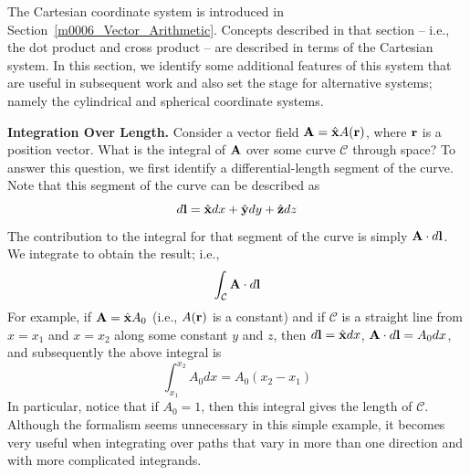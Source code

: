 

\label{m0004_Cartesian_Coordinates} %

The Cartesian coordinate system is introduced in Section~\ref{m0006_Vector_Arithmetic}.
Concepts described in that section -- i.e., the dot product and cross product -- are described in terms of the Cartesian system.
In this section, we identify some additional features of this system that are useful in subsequent work and also set the stage for alternative systems; namely the cylindrical and spherical coordinate systems.  

{\bf Integration Over Length.}  
Consider a vector field ${\bf A}=\hat{\bf x}A({\bf r})$, where ${\bf r}$ is a position vector.
What is the integral of ${\bf A}$ over some curve $\mathcal{C}$ through space?
To answer this question, we first identify a differential-length segment of the curve. Note that this segment of the curve can be described as
%
\begin{equation}
d{\bf l} = \hat{\bf x}dx + \hat{\bf y}dy + \hat{\bf z}dz 
\end{equation}
%
The contribution to the integral for that segment of the curve is simply ${\bf A}\cdot d{\bf l}$. 
We integrate to obtain the result; i.e.,
%
\begin{equation}
\int_{\mathcal C}{ {\bf A}\cdot d{\bf l} }
\end{equation}
%
For example, 
if ${\bf A}=\hat{\bf x}A_0$ (i.e., $A({\bf r})$ is a constant) 
and if $\mathcal{C}$ is a straight line from $x=x_1$ and $x=x_2$ along some constant $y$ and $z$, then 
$d{\bf l} = \hat{\bf x}dx$, ${\bf A}\cdot d{\bf l}=A_0 dx$, and subsequently the above integral is
%
\begin{equation}
\int_{x_1}^{x_2}{ A_0 dx } = A_0\left(x_2-x_1\right)
\end{equation}
%
In particular, notice that if $A_0=1$, then this integral gives the length of ${\mathcal C}$.
Although the formalism seems unnecessary in this simple example, it becomes very useful when integrating over paths that vary in more than one direction and with more complicated integrands.

